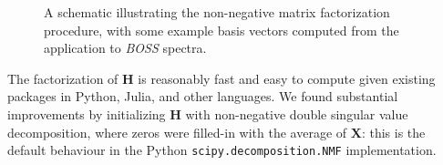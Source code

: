 \documentclass[modern]{aastex631}
\newcommand{\vectheta}{\boldsymbol{\theta}}
\newcommand{\vecpsi}{\boldsymbol{\psi}}
\newcommand{\vecW}{\mathbf{W}}
\newcommand{\vecH}{\mathbf{H}}
\newcommand{\vecX}{\mathbf{X}}
\begin{document}



\begin{figure*}
    \caption{A schematic illustrating the non-negative matrix factorization procedure, with some example basis vectors computed from the application to \emph{BOSS} spectra. \label{fig:schematic}}
\end{figure*}

The factorization of $\vecH$ is reasonably fast and easy to compute given existing packages in Python, Julia, and other languages. We found substantial improvements by initializing $\vecH$ with non-negative double singular value decomposition, where zeros were filled-in with the average of $\vecX$: this is the default behaviour in the Python \texttt{scipy.decomposition.NMF} implementation. \\

\end{document}
